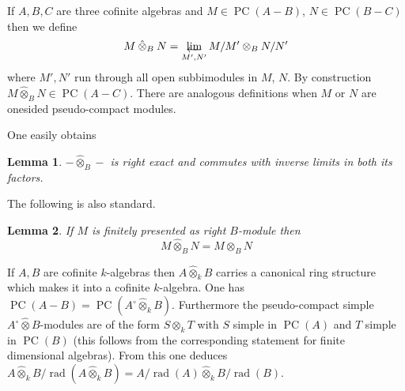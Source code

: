 \documentclass{amsproc}
\def\ctimes{\mathbin{\hat{\otimes}}}
\def\rad{\operatorname {rad}}
\let\invlim\projlim
\DeclareMathOperator{\PC}{PC}
\newtheorem{lemma}{Lemma}[section]
\theoremstyle{definition}
\theoremstyle{remark}
\def\invlim{\mathop{\vtop{\baselineskip -100pt\lineskip -1pt\lineskiplimit 0pt
\setbox0\hbox{\upshape lim}\copy0\hbox to \wd0{\leftarrowfill}}}\limits}
\numberwithin{equation}{section}
\numberwithin{table}{section}
\numberwithin{figure}{section}
\begin{document}
If $A,B,C$ are three cofinite algebras and $M\in \PC(A-B)$, $N\in
\PC(B-C)$ then we define 
\[
M\ctimes_B N =\invlim_{M',N'} M/M'\otimes_B N/N'
\]
where $M',N'$ run through all open subbimodules in $M$, $N$. By
construction $M\ctimes_B N\in \PC(A-C)$. There are analogous definitions
 when $M$ or $N$ are onesided pseudo-compact modules.

One easily obtains
\begin{lemma}
  $-\ctimes_B-$ is right exact and commutes with inverse limits in
  both its factors.
\end{lemma}
The following is also standard.
 \begin{lemma}
\label{ref:4.14a}
 If $M$ is finitely presented as right $B$-module then
 \[
 M\ctimes_B N=M\otimes_B N
 \]
\end{lemma}
If $A,B$ are cofinite $k$-algebras then $A\ctimes_k B$ carries a canonical
ring structure which makes it into a cofinite $k$-algebra.
One has $\PC(A-B)=\PC(A^\circ\ctimes_k B)$. Furthermore the
pseudo-compact simple $A^\circ\ctimes B$-modules are of the form
$S\otimes_k T$ with $S$ simple in $\PC(A)$ and $T$ simple in $\PC(B)$
(this follows from the corresponding statement for finite dimensional
algebras). From this one deduces $A\ctimes_k B/\rad (A\ctimes_k
B)=A/\rad(A)\ctimes_k B/\rad(B)$. 
\end{document}
